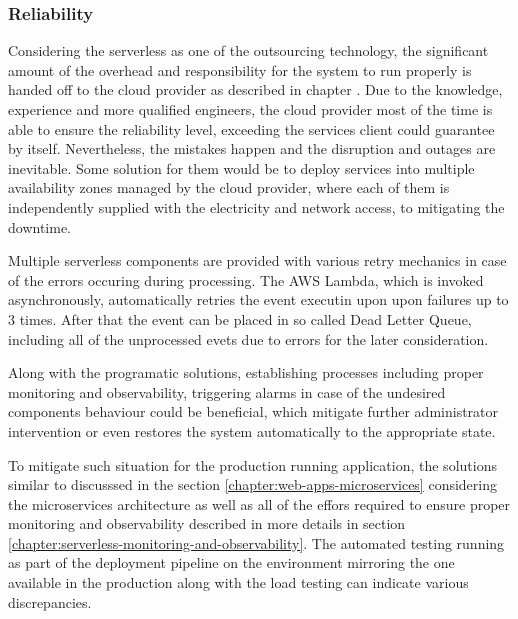 
\subsubsection{Reliability}

Considering the serverless as one of the outsourcing technology, the significant amount of the overhead and responsibility for the system to run properly is handed off to the cloud provider as described in chapter \label{chapter:serverless-suitability-vendor-dependence}. Due to the knowledge, experience and more qualified engineers, the cloud provider most of the time is able to ensure the reliability level, exceeding the services client could guarantee by itself. Nevertheless, the mistakes happen and the disruption and outages are inevitable. Some solution for them would be to deploy services into multiple availability zones managed by the cloud provider, where each of them is independently supplied with the electricity and network access, to mitigating the downtime.

Multiple serverless components are provided with various retry mechanics in case of the errors occuring during processing. The AWS Lambda, which is invoked asynchronously, automatically retries the event executin upon upon failures up to 3 times. After that the event can be placed in so called Dead Letter Queue, including all of the unprocessed evets due to errors for the later consideration. 

Along with the programatic solutions, establishing processes including proper monitoring and observability, triggering alarms in case of the undesired components behaviour could be beneficial, which mitigate further administrator intervention or even restores the system automatically to the appropriate state.

To mitigate such situation for the production running application, the solutions similar to discusssed in the section \ref{chapter:web-apps-microservices} considering the microservices architecture as well as all of the effors required to ensure proper monitoring and observability described in more details in section \ref{chapter:serverless-monitoring-and-observability}.
The automated testing running as part of the deployment pipeline on the environment mirroring the one available in the production along with the load testing can indicate various discrepancies.


